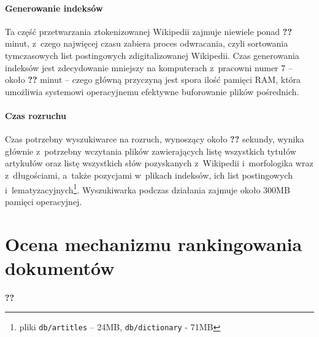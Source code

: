 \documentclass[a4paper,12pt]{article}
\begin{document}
\paragraph{Generowanie indeksów}
Ta część przetwarzania ztokenizowanej Wikipedii zajmuje niewiele ponad \textbf{??}
minut, z~czego najwięcej czasu zabiera proces odwracania, czyli
sortowania tymczasowych list postingowych zdigitalizowanej Wikipedii. Czas
generowania indeksów jest zdecydowanie mniejszy na komputerach z~pracowni numer
7 -- około \textbf{??} minut -- czego główną przyczyną jest spora ilość pamięci RAM,
która umożliwia systemowi operacyjnemu efektywne buforowanie plików pośrednich.

\paragraph{Czas rozruchu}
Czas potrzebny wyszukiwarce na rozruch, wynoszący około \textbf{??} sekundy, wynika
głównie z~potrzebny wczytania plików zawierających listę wszystkich tytułów
artykułów oraz listę wszystkich słów pozyskanych z~Wikipedii i~morfologika wraz
z~długościami, a~także pozycjami w~plikach indeksów, ich list postingowych
i~lematyzacyjnych\footnote{pliki \texttt{db/artitles} -- 24MB,
\texttt{db/dictionary} - 71MB}. Wyszukiwarka podczas działania zajmuje około
300MB pamięci operacyjnej.

\section{Ocena mechanizmu rankingowania dokumentów}
\textbf{??}
\end{document}
